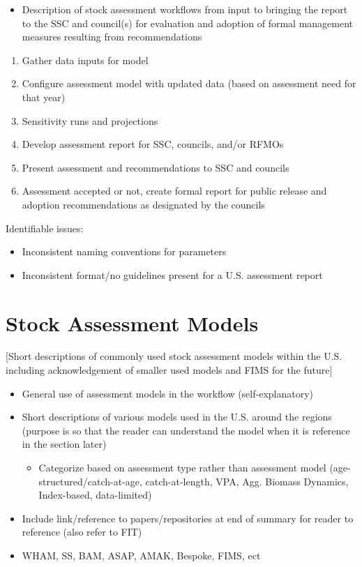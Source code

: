 \documentclass[
  letterpaper,
  oneside,
  open=any]{scrbook}
\providecommand{\tightlist}{%
  \setlength{\itemsep}{0pt}\setlength{\parskip}{0pt}}\usepackage{longtable,booktabs,array}
\begin{document}
\begin{itemize}
\tightlist
\item
  Description of stock assessment workflows from input to bringing the
  report to the SSC and council(s) for evaluation and adoption of formal
  management measures resulting from recommendations
\end{itemize}

\begin{enumerate}
\def\labelenumi{\arabic{enumi}.}
\item
  Gather data inputs for model
\item
  Configure assessment model with updated data (based on assessment need
  for that year)
\item
  Sensitivity runs and projections
\item
  Develop assessment report for SSC, councils, and/or RFMOs
\item
  Present assessment and recommendations to SSC and councils
\item
  Assessment accepted or not, create formal report for public release
  and adoption recommendations as designated by the councils
\end{enumerate}

Identifiable issues:

\begin{itemize}
\item
  Inconsistent naming conventions for parameters
\item
  Inconsistent format/no guidelines present for a U.S. assessment report
\end{itemize}


\chapter{Stock Assessment Models}\label{stock-assessment-models}

{[}Short descriptions of commonly used stock assessment models within
the U.S. including acknowledgement of smaller used models and FIMS for
the future{]}

\begin{itemize}
\item
  General use of assessment models in the workflow (self-explanatory)
\item
  Short descriptions of various models used in the U.S. around the
  regions (purpose is so that the reader can understand the model when
  it is reference in the section later)

  \begin{itemize}
  \tightlist
  \item
    Categorize based on assessment type rather than assessment model
    (age-structured/catch-at-age, catch-at-length, VPA, Agg. Biomass
    Dynamics, Index-based, data-limited)
  \end{itemize}
\item
  Include link/reference to papers/repositories at end of summary for
  reader to reference (also refer to FIT)
\item
  WHAM, SS, BAM, ASAP, AMAK, Bespoke, FIMS, ect
\end{itemize}
\end{document}
